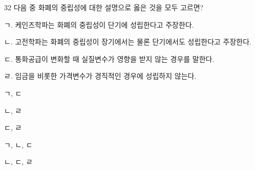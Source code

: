 \begin{question}{32}
다음 중 화폐의 중립성에 대한 설명으로 옳은 것을 모두 고르면?
\begin{framedtext}
ㄱ. 케인즈학파는 화폐의 중립성이 단기에 성립한다고 주장한다. \par
ㄴ. 고전학파는 화폐의 중립성이 장기에서는 물론 단기에서도 성립한다고 주장한다. \par
ㄷ. 통화공급이 변화할 때 실질변수가 영향을 받지 않는 경우를 말한다. \par
ㄹ. 임금을 비롯한 가격변수가 경직적인 경우에 성립하지 않는다. \par
\end{framedtext}
\begin{choices}
  \item ㄱ, ㄷ
  \item ㄴ, ㄹ
  \item ㄷ, ㄹ
  \item ㄱ, ㄴ, ㄷ
  \item ㄴ, ㄷ, ㄹ
\end{choices}
\end{question}
